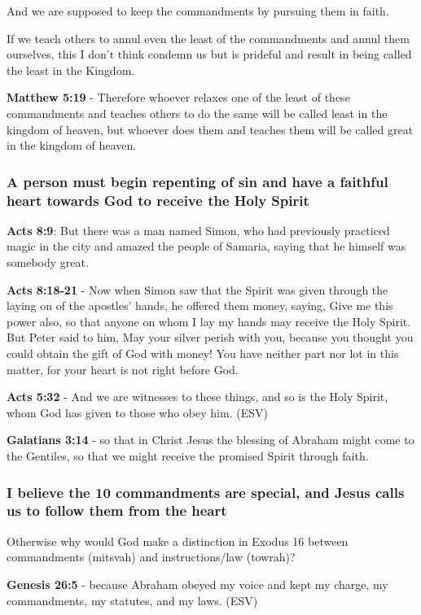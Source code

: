 \documentclass[11pt]{article}
\begin{document}
And we are supposed to keep the commandments by pursuing them in faith.

If we teach others to annul even the least of the commandments and annul them ourselves, this I don't think condemn us but is prideful and result in being called the least in the Kingdom.

\textbf{Matthew 5:19} - Therefore whoever relaxes one of the least of these commandments and teaches others to do the same will be called least in the kingdom of heaven, but whoever does them and teaches them will be called great in the kingdom of heaven.

\subsubsection{A person must begin repenting of sin and have a faithful heart towards God to receive the Holy Spirit}
\label{sec:org96c42d9}
\textbf{Acts 8:9}: But there was a man named Simon, who had previously practiced magic in the city and amazed the people of Samaria, saying that he himself was somebody great.

\textbf{Acts 8:18-21} - Now when Simon saw that the Spirit was given through the laying on of the apostles' hands, he offered them money, saying, Give me this power also, so that anyone on whom I lay my hands may receive the Holy Spirit.  But Peter said to him, May your silver perish with you, because you thought you could obtain the gift of God with money!  You have neither part nor lot in this matter, for your heart is not right before God.

\textbf{Acts 5:32} - And we are witnesses to these things, and so is the Holy Spirit, whom God has given to those who obey him. (ESV)

\textbf{Galatians 3:14} - so that in Christ Jesus the blessing of Abraham might come to the Gentiles, so that we might receive the promised Spirit through faith.

\subsubsection{I believe the 10 commandments are special, and Jesus calls us to follow them from the heart}
\label{sec:org6da605d}
Otherwise why would God make a distinction in Exodus 16 between commandments (mitsvah) and instructions/law (towrah)?

\textbf{Genesis 26:5} - because Abraham obeyed my voice and kept my charge, my commandments, my statutes, and my laws. (ESV)
\end{document}
